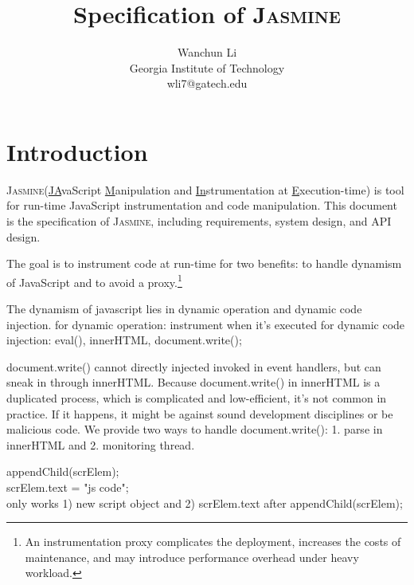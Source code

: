 \documentclass[a4paper,twocolumn,10pt]{article}
\newcommand{\jasmine}{{\textsc{Jasmine}}\xspace}
\begin{document}
\date{}

\title{\Large \bf Specification of \jasmine}
\author{
{\rm Wanchun Li}\\
Georgia Institute of Technology\\
wli7@gatech.edu
}

\maketitle
\pagestyle{plain}

\section{Introduction}
\jasmine (\underline{JA}vaScript \underline{M}anipulation and \underline{In}strumentation at \underline{E}xecution-time) is tool for run-time JavaScript instrumentation and code manipulation. This document is the specification of \jasmine, including requirements, system design, and API design.

The goal is to instrument code at run-time for two benefits: to handle dynamism of JavaScript and to avoid a proxy.\footnote{An instrumentation proxy complicates the deployment, increases the costs of maintenance, and may introduce performance overhead under heavy workload.}

The dynamism of javascript lies in dynamic operation and dynamic code injection.
for dynamic operation: instrument when it's executed
for dynamic code injection: eval(), innerHTML, document.write();

document.write() cannot directly injected invoked in event handlers, but can sneak in through innerHTML. Because document.write() in innerHTML is a duplicated process, which is complicated and low-efficient, it's not common in practice. If it happens, it might be against sound development disciplines or be malicious code. We provide two ways to handle document.write(): 1. parse in innerHTML and 2. monitoring thread.


appendChild(scrElem); \\
scrElem.text = "js code";\\

only works 1) new script object and 2) scrElem.text after appendChild(scrElem);



\end{document}
